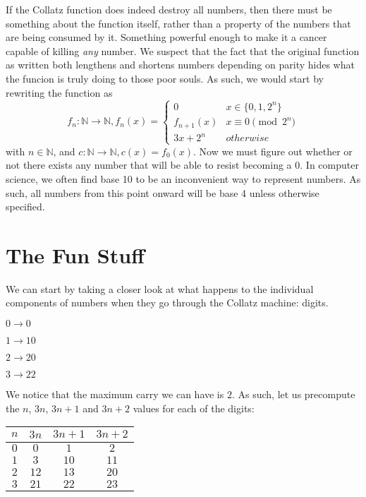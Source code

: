 \documentclass{proc-l}
\theoremstyle{definition}
\theoremstyle{remark}
\numberwithin{equation}{section}
\begin{document}
If the Collatz function does indeed destroy all numbers, then there must be something about the function itself, rather than a property of the numbers that are being consumed by it. Something powerful enough to make it a cancer capable of killing \textit{any} number.     
We suspect that the fact that the original function as written both lengthens and shortens numbers depending on parity hides what the funcion is truly doing to those poor souls. As such, we would start by rewriting the function as 
\[f_{n} : \mathbb{N} \rightarrow \mathbb{N}, 
f_{n}(x) = 
\begin{cases}
0 & x \in \{0, 1, 2^n\} \\
f_{n+1}(x) & x \equiv 0 \pmod {2^n} \\
3x + 2^n & otherwise
\end{cases}
\] with $n \in \mathbb{N}$, and 
\( c : \mathbb{N} \rightarrow \mathbb{N}, c(x) = f_0(x)
\). Now we must figure out whether or not there exists any number that will be able to resist becoming a $0$.
In computer science, we often find base 10 to be an inconvenient way to represent numbers. As such, all numbers from this point onward will be base 4 unless otherwise specified.

\section{The Fun Stuff}

We can start by taking a closer look at what happens to the individual components of numbers when they go through the Collatz machine: digits.

$0 \rightarrow 0$

$1 \rightarrow 10$

$2 \rightarrow 20$

$3 \rightarrow 22$

We notice that the maximum carry we can have is $2$. As such, let us precompute the $n$, $3n$, $3n+1$ and $3n+2$ values for each of the digits:

\begin{center}
\begin{tabular}{||c c c c||}
\hline
$n$ & $3n$ & $3n + 1$ & $3n + 2$ \\ [0.5ex]
\hline
\hline
$0$ & $0$ & $1$ & $2$\\
\hline
$1$ & $3$ & $10$ & $11$\\
\hline
$2$ & $12$ & $13$ & $20$\\
\hline
$3$ & $21$ & $22$ & $23$\\
\hline
\end{tabular}
\end{center}
\end{document}

